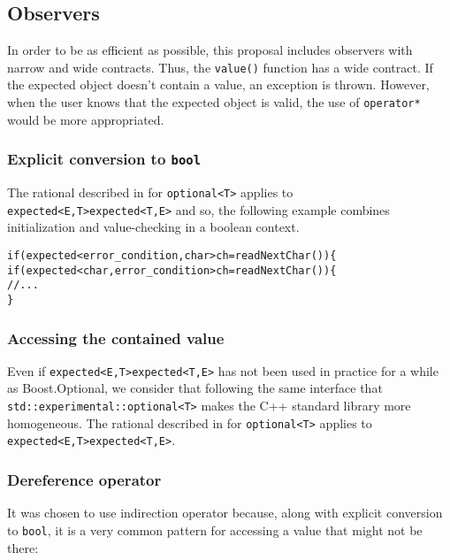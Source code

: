 \documentclass[a4paper,10pt]{article}
\newcommand{\cpp}[1]{\lstinline{#1}}
\newcommand{\suppress}[1]{\colorbox{suppress_color}{#1}}
\newcommand{\update}[1]{\colorbox{update_color}{#1}}
\begin{document}
\subsection{Observers}

In order to be as efficient as possible, this proposal includes observers with narrow and wide contracts. Thus, the \cpp{value()} function has a wide contract. If the expected object doesn't contain a value, an exception is thrown. However, when the user knows that the expected object is valid, the use of \cpp{operator*} would be more appropriated. 

\subsubsection{Explicit conversion to \cpp{bool}}

The rational described in \cite{OptionalRev4} for \cpp{optional<T>} applies to \suppress{\cpp{expected<E,T>}}\update{\cpp{expected<T,E>}} and so, the following example combines initialization and value-checking in a boolean context.

\begin{alltt}
\suppress{if (expected<error_condition, char> ch = readNextChar()) \{}
\update{if (expected<char, error_condition> ch = readNextChar()) \{}
  // ...
\}
\end{alltt}

\subsubsection{Accessing the contained value}

Even if \suppress{\cpp{expected<E,T>}}\update{\cpp{expected<T,E>}} has not been used in practice for a while as Boost.Optional, we consider that following the same interface that \cpp{std::experimental::optional<T>} makes the C++ standard library more homogeneous. The rational described in \cite{OptionalRev4} for \cpp{optional<T>} applies to \suppress{\cpp{expected<E,T>}}\update{\cpp{expected<T,E>}}. 

\subsubsection{Dereference operator}

It was chosen to use indirection operator because, along with explicit conversion to \cpp{bool}, it is a very common pattern for accessing a value that might not be there:
\end{document}
